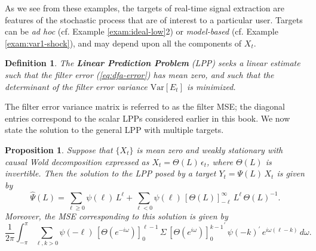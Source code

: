 \documentclass[a4paper]{book}
\newtheorem{Proposition}{Proposition}
\newtheorem{Definition}{Definition}
\begin{document}
As we see from these examples, the targets of real-time signal 
 extraction  are features of the stochastic process that are of interest to 
 a particular user.   Targets can be {\em ad hoc} 
 (cf. Example \ref{exam:ideal-low}2) or {\em model-based} (cf. Example \ref{exam:var1-shock}),
   and may   depend upon  all the components   of $X_t$.    
 

\begin{Definition} \rm
\label{def:lpp2}
 The {\bf Linear Prediction Problem} (LPP) seeks a linear estimate
    such that the filter error (\ref{eq:dfa-error})
 has mean zero, and  such that the determinant of the filter 
    error variance $\mbox{Var} [ E_t ]$ is minimized.
\end{Definition}

The filter error variance matrix is referred to as the filter MSE;
 the diagonal entries correspond to the scalar LPPs considered
 earlier in this book.   We now state the   solution to the general LPP
 with multiple targets.

\begin{Proposition}
 \label{prop:GPP2}
 Suppose that $\{ X_t \}$ is mean zero and weakly stationary 
 with  causal Wold decomposition expressed as $X_t = \Theta (L) \, \epsilon_t$,
 where $\Theta (L)$ is invertible.    Then the solution
 to the LPP posed by a   target $Y_t = \Psi (L) \, X_t$ is given by
\begin{equation}
 \label{eq:GPPsoln}
 \widehat{\Psi} (L) = \sum_{\ell \geq 0 } \psi (\ell) \, L^{\ell} + 
 \sum_{\ell < 0 } \psi (\ell)
 \,  { [ \Theta (L) ]}_{-\ell}^{ \infty  } \, L^{\ell} \, {\Theta (L) }^{-1}.
\end{equation}
 Moreover, the   MSE  corresponding to this solution is given by
\begin{equation} 
\label{eq:minimalMSE}
 \frac{1}{ 2 \pi} \int_{-\pi}^{\pi}   \sum_{\ell, k > 0 } \psi (-\ell) \,
  {[ \Theta  (e^{-i \omega}) ]}_0^{\ell-1}   \,  \Sigma \,
  { {[ \Theta  (e^{i \omega}) ]}_0^{ k-1} }^{\prime}  \,
   {\psi (-k) }^{\prime} \,  e^{i \omega (\ell - k) }   \, d\omega.
\end{equation}
 \end{Proposition}

  
\end{document}
